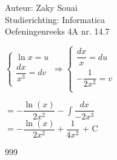 \documentclass[a4paper]{article}
\begin{document}
  
\noindent \large Auteur: Zaky Souai \\
\noindent \large Studierichting:  Informatica\\
\noindent \large Oefeningenreeks 4A nr. 14.7\\

\bigskip

\normalsize

$\left\{
	\begin{array}{l}
		 \ln x = u \\
		 \dfrac{dx}{x^3} = dv\\
	\end{array}
\right.
\Rightarrow
\left\{
	\begin{array}{l}
		\dfrac{dx}{x} = du\\
	    -\dfrac{1}{2x^2} = v\\
	\end{array}
\right.$

$= -\dfrac{\ln(x)}{2x^2} - \displaystyle\int\dfrac{dx}{-2x^3}$\\

$= -\dfrac{\ln(x)}{2x^2} + \dfrac{1}{4x^2}$ + C\\

\begin{thebibliography}{999}
\end{thebibliography}
\end{document}
